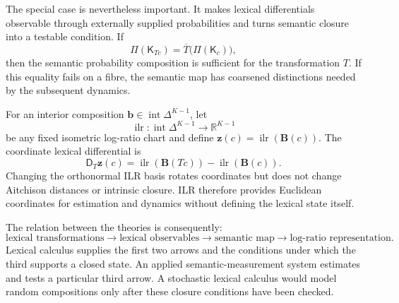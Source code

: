 \documentclass[11pt]{article}
\newcommand{\Bmap}{\mathbf B}
\newcommand{\Kern}{\mathsf K}
\newcommand{\Dlex}{\mathsf D}
\begin{document}
The special case is nevertheless important. It makes lexical differentials observable through externally supplied probabilities and turns semantic closure into a testable condition. If
\[
 \Pi(\Kern_{Tc})=\overline T\bigl(\Pi(\Kern_c)\bigr),
\]
then the semantic probability composition is sufficient for the transformation $T$. If this equality fails on a fibre, the semantic map has coarsened distinctions needed by the subsequent dynamics.

For an interior composition $\bm b\in\operatorname{int}\Delta^{K-1}$, let
\[
 \operatorname{ilr}:\operatorname{int}\Delta^{K-1}\longrightarrow\mathbb R^{K-1}
\]
be any fixed isometric log-ratio chart and define $\bm z(c)=\operatorname{ilr}(\Bmap(c))$. The coordinate lexical differential is
\[
 \Dlex_T\bm z(c)
 =\operatorname{ilr}(\Bmap(Tc))-\operatorname{ilr}(\Bmap(c)).
\]
Changing the orthonormal ILR basis rotates coordinates but does not change Aitchison distances or intrinsic closure. ILR therefore provides Euclidean coordinates for estimation and dynamics without defining the lexical state itself.

The relation between the theories is consequently:
\[
 \text{lexical transformations}
 \longrightarrow
 \text{lexical observables}
 \longrightarrow
 \text{semantic map}
 \longrightarrow
 \text{log-ratio representation}.
\]
Lexical calculus supplies the first two arrows and the conditions under which the third supports a closed state. An applied semantic-measurement system estimates and tests a particular third arrow. A stochastic lexical calculus would model random compositions only after these closure conditions have been checked.
\end{document}
